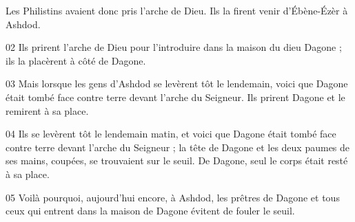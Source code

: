  Les Philistins avaient donc pris l’arche de Dieu. Ils la firent venir d’Ébène-Ézèr à Ashdod.

02 Ils prirent l’arche de Dieu pour l’introduire dans la maison du dieu Dagone ; ils la placèrent à côté de Dagone.

03 Mais lorsque les gens d’Ashdod se levèrent tôt le lendemain, voici que Dagone était tombé face contre terre devant l’arche du Seigneur. Ils prirent Dagone et le remirent à sa place.

04 Ils se levèrent tôt le lendemain matin, et voici que Dagone était tombé face contre terre devant l’arche du Seigneur ; la tête de Dagone et les deux paumes de ses mains, coupées, se trouvaient sur le seuil. De Dagone, seul le corps était resté à sa place.

05 Voilà pourquoi, aujourd’hui encore, à Ashdod, les prêtres de Dagone et tous ceux qui entrent dans la maison de Dagone évitent de fouler le seuil.
